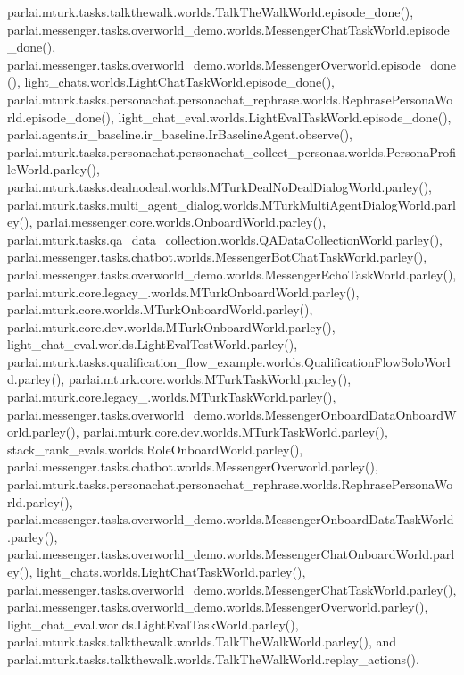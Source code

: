 parlai.\+mturk.\+tasks.\+talkthewalk.\+worlds.\+Talk\+The\+Walk\+World.\+episode\+\_\+done(), parlai.\+messenger.\+tasks.\+overworld\+\_\+demo.\+worlds.\+Messenger\+Chat\+Task\+World.\+episode\+\_\+done(), parlai.\+messenger.\+tasks.\+overworld\+\_\+demo.\+worlds.\+Messenger\+Overworld.\+episode\+\_\+done(), light\+\_\+chats.\+worlds.\+Light\+Chat\+Task\+World.\+episode\+\_\+done(), parlai.\+mturk.\+tasks.\+personachat.\+personachat\+\_\+rephrase.\+worlds.\+Rephrase\+Persona\+World.\+episode\+\_\+done(), light\+\_\+chat\+\_\+eval.\+worlds.\+Light\+Eval\+Task\+World.\+episode\+\_\+done(), parlai.\+agents.\+ir\+\_\+baseline.\+ir\+\_\+baseline.\+Ir\+Baseline\+Agent.\+observe(), parlai.\+mturk.\+tasks.\+personachat.\+personachat\+\_\+collect\+\_\+personas.\+worlds.\+Persona\+Profile\+World.\+parley(), parlai.\+mturk.\+tasks.\+dealnodeal.\+worlds.\+M\+Turk\+Deal\+No\+Deal\+Dialog\+World.\+parley(), parlai.\+mturk.\+tasks.\+multi\+\_\+agent\+\_\+dialog.\+worlds.\+M\+Turk\+Multi\+Agent\+Dialog\+World.\+parley(), parlai.\+messenger.\+core.\+worlds.\+Onboard\+World.\+parley(), parlai.\+mturk.\+tasks.\+qa\+\_\+data\+\_\+collection.\+worlds.\+Q\+A\+Data\+Collection\+World.\+parley(), parlai.\+messenger.\+tasks.\+chatbot.\+worlds.\+Messenger\+Bot\+Chat\+Task\+World.\+parley(), parlai.\+messenger.\+tasks.\+overworld\+\_\+demo.\+worlds.\+Messenger\+Echo\+Task\+World.\+parley(), parlai.\+mturk.\+core.\+legacy\+\_.\+worlds.\+M\+Turk\+Onboard\+World.\+parley(), parlai.\+mturk.\+core.\+worlds.\+M\+Turk\+Onboard\+World.\+parley(), parlai.\+mturk.\+core.\+dev.\+worlds.\+M\+Turk\+Onboard\+World.\+parley(), light\+\_\+chat\+\_\+eval.\+worlds.\+Light\+Eval\+Test\+World.\+parley(), parlai.\+mturk.\+tasks.\+qualification\+\_\+flow\+\_\+example.\+worlds.\+Qualification\+Flow\+Solo\+World.\+parley(), parlai.\+mturk.\+core.\+worlds.\+M\+Turk\+Task\+World.\+parley(), parlai.\+mturk.\+core.\+legacy\+\_.\+worlds.\+M\+Turk\+Task\+World.\+parley(), parlai.\+messenger.\+tasks.\+overworld\+\_\+demo.\+worlds.\+Messenger\+Onboard\+Data\+Onboard\+World.\+parley(), parlai.\+mturk.\+core.\+dev.\+worlds.\+M\+Turk\+Task\+World.\+parley(), stack\+\_\+rank\+\_\+evals.\+worlds.\+Role\+Onboard\+World.\+parley(), parlai.\+messenger.\+tasks.\+chatbot.\+worlds.\+Messenger\+Overworld.\+parley(), parlai.\+mturk.\+tasks.\+personachat.\+personachat\+\_\+rephrase.\+worlds.\+Rephrase\+Persona\+World.\+parley(), parlai.\+messenger.\+tasks.\+overworld\+\_\+demo.\+worlds.\+Messenger\+Onboard\+Data\+Task\+World.\+parley(), parlai.\+messenger.\+tasks.\+overworld\+\_\+demo.\+worlds.\+Messenger\+Chat\+Onboard\+World.\+parley(), light\+\_\+chats.\+worlds.\+Light\+Chat\+Task\+World.\+parley(), parlai.\+messenger.\+tasks.\+overworld\+\_\+demo.\+worlds.\+Messenger\+Chat\+Task\+World.\+parley(), parlai.\+messenger.\+tasks.\+overworld\+\_\+demo.\+worlds.\+Messenger\+Overworld.\+parley(), light\+\_\+chat\+\_\+eval.\+worlds.\+Light\+Eval\+Task\+World.\+parley(), parlai.\+mturk.\+tasks.\+talkthewalk.\+worlds.\+Talk\+The\+Walk\+World.\+parley(), and parlai.\+mturk.\+tasks.\+talkthewalk.\+worlds.\+Talk\+The\+Walk\+World.\+replay\+\_\+actions().

